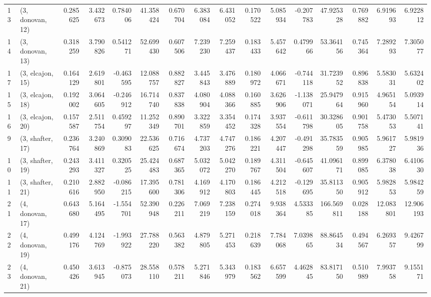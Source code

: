 \begin{tabular}{llrrrrrrrrrrrrrr}
13 &  (3, donovan, 12) &   0.285625 &  3.432673 &  0.784006 &  41.358424 &  0.670704 &   6.383084 &  6.431052 &  0.170522 &  5.085934 & -0.207783 &   47.925328 &  0.769882 &   6.919693 &   6.922812 \\
14 &  (3, donovan, 13) &   0.318259 &  3.790826 &  0.541271 &  52.699430 &  0.607506 &   7.239230 &  7.259437 &  0.183433 &  5.457642 &  0.479966 &   53.364156 &  0.745364 &   7.289293 &   7.305077 \\
17 &  (3, elcajon, 15) &   0.164129 &  2.619801 & -0.463595 &  12.088757 &  0.882827 &   3.445843 &  3.476889 &  0.180972 &  4.066671 & -0.744118 &   31.723952 &  0.896838 &   5.583031 &   5.632402 \\
15 &  (3, elcajon, 18) &   0.192002 &  3.064605 & -0.246912 &  16.714740 &  0.837838 &   4.080904 &  4.088366 &  0.160885 &  3.626906 & -1.138071 &   25.947964 &  0.915960 &   4.965154 &   5.093914 \\
16 &  (3, elcajon, 20) &   0.157587 &  2.511754 &  0.459297 &  11.252349 &  0.890701 &   3.322859 &  3.354452 &  0.174328 &  3.937554 & -0.611798 &   30.328605 &  0.901758 &   5.473053 &   5.507141 \\
9  &  (3, shafter, 17) &   0.236764 &  3.240869 &  0.309083 &  22.536625 &  0.716674 &   4.737203 &  4.747276 &  0.186221 &  4.207447 & -0.491298 &   35.783559 &  0.905985 &   5.961727 &   5.981936 \\
10 &  (3, shafter, 19) &   0.243293 &  3.411327 &  0.320525 &  25.424483 &  0.687365 &   5.032072 &  5.042270 &  0.189767 &  4.311504 & -0.645607 &   41.096171 &  0.899085 &   6.378038 &   6.410630 \\
11 &  (3, shafter, 21) &   0.210616 &  2.882950 & -0.086215 &  17.395600 &  0.781306 &   4.169912 &  4.170803 &  0.186445 &  4.212518 & -0.129695 &   35.811350 &  0.905912 &   5.982853 &   5.984259 \\
21 &  (4, donovan, 17) &   0.643680 &  5.164495 & -1.554701 &  52.390948 &  0.226211 &   7.069219 &  7.238159 &  0.274018 &  9.938364 &  4.533385 &  166.569811 &  0.028188 &  12.083801 &  12.906193 \\
22 &  (4, donovan, 19) &   0.499176 &  4.124769 & -1.993922 &  27.788220 &  0.563382 &   4.879805 &  5.271453 &  0.218639 &  7.784068 &  7.039865 &   88.864534 &  0.494567 &   6.269357 &   9.426799 \\
23 &  (4, donovan, 21) &   0.450426 &  3.613945 & -0.875073 &  28.558110 &  0.578211 &   5.271846 &  5.343979 &  0.183562 &  6.657599 &  4.462845 &   83.817150 &  0.510989 &   7.993758 &   9.155171 \\

\end{tabular}
